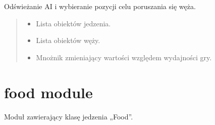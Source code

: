 \documentclass[letterpaper,10pt,polish]{sphinxmanual}
\begin{document}
\begin{fulllineitems}
\begin{fulllineitems}
\label{\detokenize{enemy:enemy.Enemy.update}}
\pysigstartsignatures
{}
\pysigstopsignatures
\sphinxAtStartPar
Odświeżanie AI i wybieranie pozycji celu poruszania się węża.
\begin{quote}\begin{description}
\begin{itemize}
\item {} 
\sphinxAtStartPar
{} \textendash{} Lista obiektów jedzenia.

\item {} 
\sphinxAtStartPar
{} \textendash{} Lista obiektów węży.

\item {} 
\sphinxAtStartPar
{} \textendash{} Mnożnik zmieniający wartości względem wydajności gry.

\end{itemize}

\end{description}\end{quote}

\end{fulllineitems}


\end{fulllineitems}


\sphinxstepscope


\section{food module}
\label{\detokenize{food:module-food}}\label{\detokenize{food:food-module}}\label{\detokenize{food::doc}}
\sphinxAtStartPar
Moduł zawierający klasę jedzenia „Food”.
\end{document}
